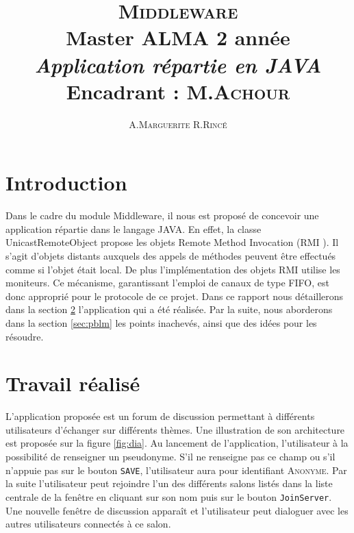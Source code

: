 \documentclass[12pt]{article}
\title{ {\huge \textsc{Middleware}} \\  Master ALMA 2\up{eme} année  \\ \emph{Application répartie en JAVA}\\{\small Encadrant :  M.\textsc{Achour}}}
\author{A.\textsc{Marguerite} R.\textsc{Rincé}}
\begin{document}
\maketitle
\renewcommand{\labelitemi}{$\bullet$} 



\section{Introduction}\label{sec:intro}
Dans le cadre du module Middleware, il nous est proposé de concevoir une application répartie dans le langage JAVA. En effet, la classe UnicastRemoteObject propose les objets Remote Method Invocation (RMI ). Il s’agit d’objets \og distants \fg{} auxquels des appels de méthodes peuvent être effectués comme si l’objet était local. De plus l’implémentation des objets RMI utilise les moniteurs. Ce mécanisme, garantissant l’emploi de canaux de type FIFO,
est donc approprié pour le protocole de ce projet. Dans ce rapport nous détaillerons dans la section \ref{sec:trav} l'application qui a été réalisée. Par la suite, nous aborderons dans la section \ref{sec:pblm} les points inachevés, ainsi que des idées pour les résoudre. 

\section{Travail réalisé}\label{sec:trav}
L'application proposée est un forum de discussion permettant à différents utilisateurs d'échanger sur différents thèmes. Une illustration de son architecture est proposée sur la figure \ref{fig:dia}. Au lancement de l'application, l'utilisateur à la possibilité de renseigner un pseudonyme. S'il ne renseigne pas ce champ ou s'il n'appuie pas  sur le bouton \verb+SAVE+, l'utilisateur aura pour identifiant \textsc{Anonyme}. Par la suite l'utilisateur peut rejoindre l'un des différents \og salons \fg listés dans la liste centrale de la fenêtre en cliquant sur son nom puis sur le bouton \verb+JoinServer+. Une nouvelle fenêtre de discussion apparaît et l'utilisateur peut dialoguer avec les autres utilisateurs connectés à ce salon. 
\end{document}

